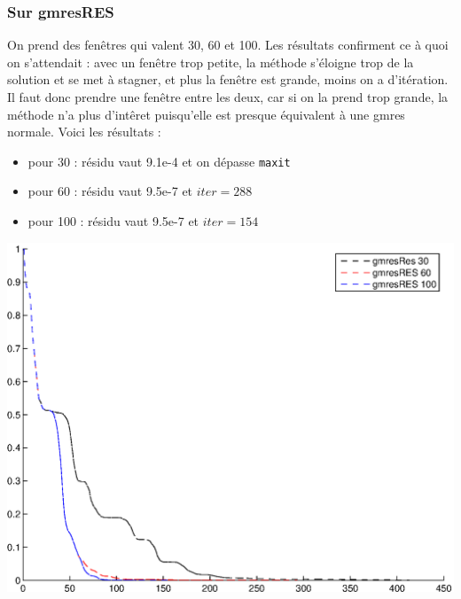 \subsubsection*{Sur gmresRES}
On prend des fenêtres qui valent 30, 60 et 100. Les résultats confirment ce à quoi on s'attendait : avec un fenêtre trop petite, la méthode s'éloigne trop de la solution et se met à stagner, et plus la fenêtre est grande, moins on a d'itération. Il faut donc prendre une fenêtre entre les deux, car si on la prend trop grande, la méthode n'a plus d'intêret puisqu'elle est presque équivalent à une gmres normale. Voici les résultats :
\begin{itemize}
\item pour 30 : résidu vaut 9.1e-4 et on dépasse \texttt{maxit}
\item pour 60 : résidu vaut 9.5e-7 et $iter=288$
\item pour 100 : résidu vaut 9.5e-7 et $iter=154$
\end{itemize}
\begin{center}
\includegraphics[scale=0.65]{res.eps}
\end{center}
\newpage
